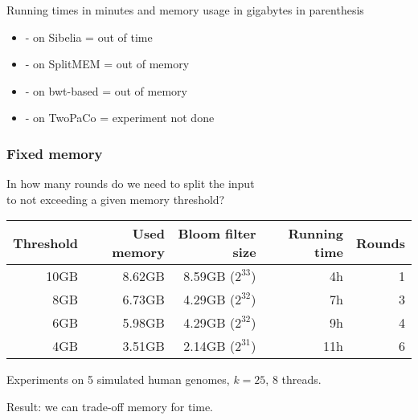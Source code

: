 \begin{frame}
{    }

    \medskip

    Running times in minutes and memory usage in gigabytes in parenthesis
        
    \medskip
    
    \begin{itemize}
      \item - on Sibelia = out of time
      \item - on SplitMEM = out of memory
      \item - on bwt-based = out of memory
      \item - on TwoPaCo = experiment not done
    \end{itemize}

\end{frame}


\begin{frame}
	\frametitle{Fixed memory}
	\centering
	
	In how many rounds do we need to split the input\\ to not exceeding a given memory threshold?
	
	\bigskip
	
	\begin{tabular}{ | r | r | r | r | r | }
  \hline
  Threshold  & Used memory & Bloom filter size & Running time & Rounds \\ \hline
  {\color{red}10GB}   &      8.62GB &       8.59GB ($2^{33}$) & {\color{green}4h} &      1 \\
  {\color{orange}8GB} &      6.73GB &       4.29GB ($2^{32}$) & {\color{orange}7h} &      3 \\
  {\color{orange}6GB} &      5.98GB &       4.29GB ($2^{32}$) & {\color{orange}9h} &      4 \\
  {\color{green}4GB}  &      3.51GB &       2.14GB ($2^{31}$) & {\color{red}11h} &      6 \\
  \hline
  \end{tabular}
  
  \medskip
  
  Experiments on 5 simulated human genomes, $k = 25$, 8 threads.
  
  \medskip
  
  Result: we can trade-off memory for time.
  

\end{frame}

